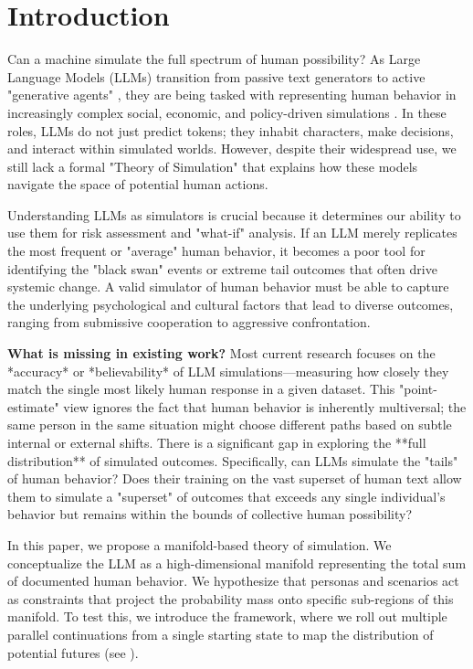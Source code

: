 \section{Introduction}
\label{sec:intro}

Can a machine simulate the full spectrum of human possibility? As Large Language Models (LLMs) transition from passive text generators to active "generative agents" \cite{park2023generative}, they are being tasked with representing human behavior in increasingly complex social, economic, and policy-driven simulations \cite{horton2023homo}. In these roles, LLMs do not just predict tokens; they inhabit characters, make decisions, and interact within simulated worlds. However, despite their widespread use, we still lack a formal "Theory of Simulation" that explains how these models navigate the space of potential human actions.

Understanding LLMs as simulators is crucial because it determines our ability to use them for risk assessment and "what-if" analysis. If an LLM merely replicates the most frequent or "average" human behavior, it becomes a poor tool for identifying the "black swan" events or extreme tail outcomes that often drive systemic change. A valid simulator of human behavior must be able to capture the underlying psychological and cultural factors that lead to diverse outcomes, ranging from submissive cooperation to aggressive confrontation.

{\bf What is missing in existing work?} Most current research focuses on the *accuracy* or *believability* of LLM simulations---measuring how closely they match the single most likely human response in a given dataset. This "point-estimate" view ignores the fact that human behavior is inherently multiversal; the same person in the same situation might choose different paths based on subtle internal or external shifts. There is a significant gap in exploring the **full distribution** of simulated outcomes. Specifically, can LLMs simulate the "tails" of human behavior? Does their training on the vast superset of human text allow them to simulate a "superset" of outcomes that exceeds any single individual's behavior but remains within the bounds of collective human possibility?

In this paper, we propose a manifold-based theory of simulation. We conceptualize the LLM as a high-dimensional manifold representing the total sum of documented human behavior. We hypothesize that personas and scenarios act as constraints that project the probability mass onto specific sub-regions of this manifold. To test this, we introduce the \method framework, where we roll out multiple parallel continuations from a single starting state to map the distribution of potential futures (see ).

